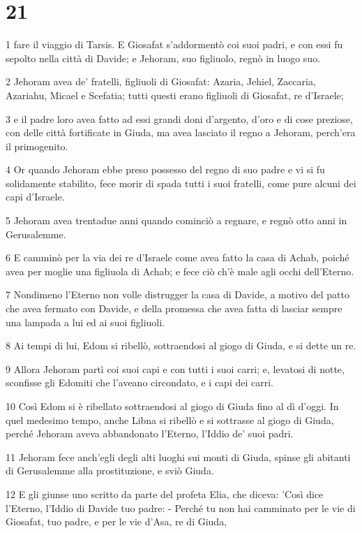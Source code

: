 \chapter{21}

\par 1 fare il viaggio di Tarsis. E Giosafat s'addormentò coi suoi padri, e con essi fu sepolto nella città di Davide; e Jehoram, suo figliuolo, regnò in luogo suo.
\par 2 Jehoram avea de' fratelli, figliuoli di Giosafat: Azaria, Jehiel, Zaccaria, Azariahu, Micael e Scefatia; tutti questi erano figliuoli di Giosafat, re d'Israele;
\par 3 e il padre loro avea fatto ad essi grandi doni d'argento, d'oro e di cose preziose, con delle città fortificate in Giuda, ma avea lasciato il regno a Jehoram, perch'era il primogenito.
\par 4 Or quando Jehoram ebbe preso possesso del regno di suo padre e vi si fu solidamente stabilito, fece morir di spada tutti i suoi fratelli, come pure alcuni dei capi d'Israele.
\par 5 Jehoram avea trentadue anni quando cominciò a regnare, e regnò otto anni in Gerusalemme.
\par 6 E camminò per la via dei re d'Israele come avea fatto la casa di Achab, poiché avea per moglie una figliuola di Achab; e fece ciò ch'è male agli occhi dell'Eterno.
\par 7 Nondimeno l'Eterno non volle distrugger la casa di Davide, a motivo del patto che avea fermato con Davide, e della promessa che avea fatta di lasciar sempre una lampada a lui ed ai suoi figliuoli.
\par 8 Ai tempi di lui, Edom si ribellò, sottraendosi al giogo di Giuda, e si dette un re.
\par 9 Allora Jehoram partì coi suoi capi e con tutti i suoi carri; e, levatosi di notte, sconfisse gli Edomiti che l'aveano circondato, e i capi dei carri.
\par 10 Così Edom si è ribellato sottraendosi al giogo di Giuda fino al dì d'oggi. In quel medesimo tempo, anche Libna si ribellò e si sottrasse al giogo di Giuda, perché Jehoram aveva abbandonato l'Eterno, l'Iddio de' suoi padri.
\par 11 Jehoram fece anch'egli degli alti luoghi sui monti di Giuda, spinse gli abitanti di Gerusalemme alla prostituzione, e sviò Giuda.
\par 12 E gli giunse uno scritto da parte del profeta Elia, che diceva: 'Così dice l'Eterno, l'Iddio di Davide tuo padre: - Perché tu non hai camminato per le vie di Giosafat, tuo padre, e per le vie d'Asa, re di Giuda,
